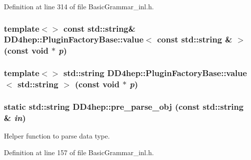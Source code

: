 Definition at line 314 of file BasicGrammar\_\-inl.h.\hypertarget{namespace_d_d4hep_a6d3b9a78f7f80ec6ee1366b7769f3b1d}{
\subsubsection[{PluginFactoryBase::value$<$ const std::string \& $>$}]{\setlength{\rightskip}{0pt plus 5cm}template$<$$>$ const std::string\& DD4hep::PluginFactoryBase::value$<$ const std::string \& $>$ (const void $\ast$ {\em p})}}
\label{namespace_d_d4hep_a6d3b9a78f7f80ec6ee1366b7769f3b1d}
\hypertarget{namespace_d_d4hep_a5b5167e44073fdcee5af1fdcb724d8f1}{
\subsubsection[{PluginFactoryBase::value$<$ std::string $>$}]{\setlength{\rightskip}{0pt plus 5cm}template$<$$>$ std::string DD4hep::PluginFactoryBase::value$<$ std::string $>$ (const void $\ast$ {\em p})}}
\label{namespace_d_d4hep_a5b5167e44073fdcee5af1fdcb724d8f1}
\hypertarget{namespace_d_d4hep_a756006d9d570012647e8d27cbe3d1f33}{
\subsubsection[{pre\_\-parse\_\-obj}]{\setlength{\rightskip}{0pt plus 5cm}static std::string DD4hep::pre\_\-parse\_\-obj (const std::string \& {\em in})}}
\label{namespace_d_d4hep_a756006d9d570012647e8d27cbe3d1f33}


Helper function to parse data type. 

Definition at line 157 of file BasicGrammar\_\-inl.h.

